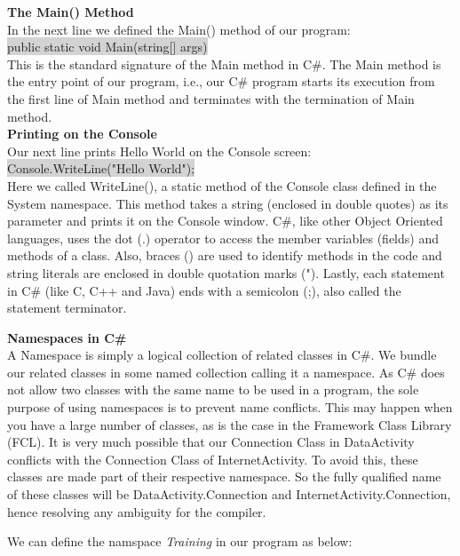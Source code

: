 \textbf{The Main() Method}\\
In the next line we defined the Main() method of our program:\\

\colorbox{lightgray}{public static void Main(string[] args)}\\

This is the standard signature of the Main method in C\#. The Main method is the entry point of our program, i.e.,
our C\# program starts its execution from the first line of Main method and terminates with the termination of Main
method.\\

\textbf{Printing on the Console}\\
Our next line prints Hello World on the Console screen:\\

\colorbox{lightgray}{Console.WriteLine("Hello World");}\\

Here we called WriteLine(), a static method of the Console class defined in the System namespace. This method
takes a string (enclosed in double quotes) as its parameter and prints it on the Console window.
C\#, like other Object Oriented languages, uses the dot (.) operator to access the member variables (fields) and
methods of a class. Also, braces () are used to identify methods in the code and string literals are enclosed in double
quotation marks ("). Lastly, each statement in C\# (like C, C++ and Java) ends with a semicolon (;), also called the
statement terminator.


\textbf{Namespaces in C\#}\\
A Namespace is simply a logical collection of related classes in C\#. We bundle our related classes in some named collection calling it a namespace. As C\# does
not allow two classes with the same name to be used in a program, the sole purpose of using namespaces is to
prevent name conflicts. This may happen when you have a large number of classes, as is the case in the Framework
Class Library (FCL). It is very much possible that our Connection Class in DataActivity conflicts with the
Connection Class of InternetActivity. To avoid this, these classes are made part of their respective namespace. So
the fully qualified name of these classes will be DataActivity.Connection and InternetActivity.Connection, hence
resolving any ambiguity for the compiler.

We can define the namspace \emph{Training} in our program as below:

